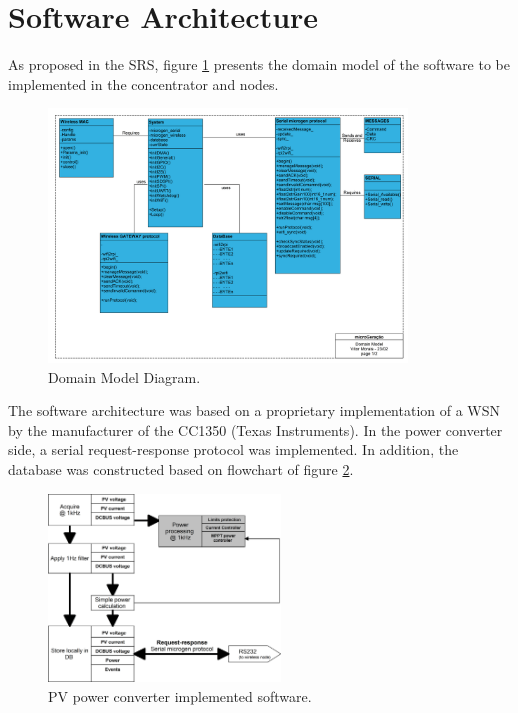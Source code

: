 \section{Software Architecture}
\label{sec:3.3}

As proposed in the SRS, figure \ref{fig:3.3.domainModel} presents the domain model of the software to be implemented in the concentrator and nodes.

\begin{figure}[h!]
	\centering
	\includegraphics[width=0.85\textwidth,keepaspectratio]{figures/domainModel}
	\caption{Domain Model Diagram.}
	\label{fig:3.3.domainModel}
\end{figure}

The software architecture was based on a proprietary implementation of a WSN by the manufacturer of the CC1350 (Texas Instruments). In the power converter side, a serial request-response protocol was implemented. In addition, the database was constructed based on flowchart of figure \ref{fig:3.3.sw1}. 

\begin{figure}[h!]
	\centering
	\includegraphics[width=0.55\textwidth,keepaspectratio]{figures/sw1}
	\caption{PV power converter implemented software.}
	\label{fig:3.3.sw1}
\end{figure}


